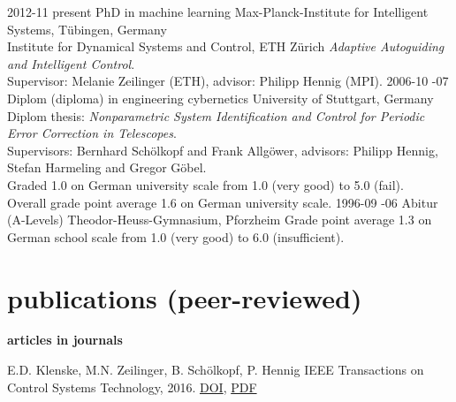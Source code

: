 \documentclass[]{k-cv} %
\begin{document}
\begin{entrylist}
\entry
{2012-11 \to present}
{PhD {\normalfont in machine learning}}
{Max-Planck-Institute for Intelligent Systems, T\"ubingen, Germany\\
\phantom{x} \hfill Institute for Dynamical Systems and Control, ETH
Z{\"u}rich}
{\emph{Adaptive Autoguiding and Intelligent Control}.\\
Supervisor: Melanie Zeilinger (ETH), \mbox{advisor}: Philipp Hennig (MPI).}
\entry
{2006-10 -07}
{Diplom {(diploma) \normalfont in engineering cybernetics}}
{University of Stuttgart, Germany}
{Diplom thesis: \emph{Nonparametric System Identification and Control for
Periodic Error Correction in Telescopes}.\\
Supervisors: Bernhard Sch\"olkopf and Frank Allg\"ower, advisors: Philipp
Hennig, Stefan Harmeling and Gregor G\"obel. \\
Graded 1.0 on German university scale from 1.0 (very
good) to 5.0 (fail).\\
Overall grade point average 1.6 on German university
scale.}
\entry
{1996-09 -06}
{Abitur (A-Levels)}
{Theodor-Heuss-Gymnasium, Pforzheim}
{Grade point average 1.3 on German school scale from 1.0 (very good) to 6.0
\mbox{(insufficient)}.}
\end{entrylist}


\section{publications (peer-reviewed)}

{\Large \bfseries articles in journals}


{E.D. Klenske, M.N. Zeilinger, B. Sch\"olkopf, P. Hennig}
{IEEE Transactions on Control Systems Technology, 2016.
\href{http://dx.doi.org/10.1109/TCST.2015.2420629}{\to DOI},
\href{https://is.tue.mpg.de/uploads_file/attachment/attachment/9/%
Klenske_tcst__1_.pdf}{\to PDF}
}
\end{document}
